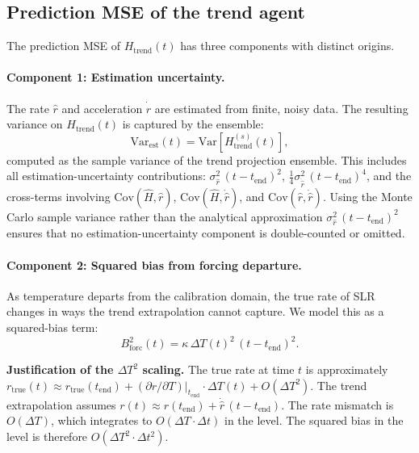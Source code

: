 \documentclass[11pt]{article}
\newcommand{\dT}{\Delta T}
\newcommand{\tend}{t_{\mathrm{end}}}
\newcommand{\sigr}{\sigma_{\hat{r}}}
\newcommand{\sigrdot}{\sigma_{\dot{\hat{r}}}}
\begin{document}
\subsection{Prediction MSE of the trend agent}
\label{sec:prediction_mse_trend}

The prediction MSE of $H_{\mathrm{trend}}(t)$ has three components with distinct origins.

\paragraph{Component 1: Estimation uncertainty.}  The rate $\hat{r}$ and acceleration $\dot{\hat{r}}$ are estimated from finite, noisy data.  The resulting variance on $H_{\mathrm{trend}}(t)$ is captured by the ensemble:
\begin{equation}
  \mathrm{Var}_{\mathrm{est}}(t) = \mathrm{Var}\!\left[H_{\mathrm{trend}}^{(s)}(t)\right],
  \label{eq:var_est}
\end{equation}
computed as the sample variance of the trend projection ensemble.  This includes all estimation-uncertainty contributions: $\sigr^2\,(t - \tend)^2$, $\frac{1}{4}\sigrdot^2\,(t - \tend)^4$, and the cross-terms involving $\mathrm{Cov}(\hat{H}, \hat{r})$, $\mathrm{Cov}(\hat{H}, \dot{\hat{r}})$, and $\mathrm{Cov}(\hat{r}, \dot{\hat{r}})$.  Using the Monte Carlo sample variance rather than the analytical approximation $\sigr^2\,(t - \tend)^2$ ensures that no estimation-uncertainty component is double-counted or omitted.

\paragraph{Component 2: Squared bias from forcing departure.}  As temperature departs from the calibration domain, the true rate of SLR changes in ways the trend extrapolation cannot capture.  We model this as a squared-bias term:
\begin{equation}
  B_{\mathrm{forc}}^2(t) = \kappa\,\dT(t)^2\,(t - \tend)^2.
  \label{eq:bias_forc}
\end{equation}

\textbf{Justification of the $\dT^2$ scaling.}  The true rate at time $t$ is approximately $r_{\mathrm{true}}(t) \approx r_{\mathrm{true}}(\tend) + (\partial r / \partial T)\big|_{\tend} \cdot \dT(t) + O(\dT^2)$.  The trend extrapolation assumes $r(t) \approx r(\tend) + \dot{\hat{r}}\,(t - \tend)$.  The rate mismatch is $O(\dT)$, which integrates to $O(\dT \cdot \Delta t)$ in the level.  The squared bias in the level is therefore $O(\dT^2 \cdot \Delta t^2)$.
\end{document}
